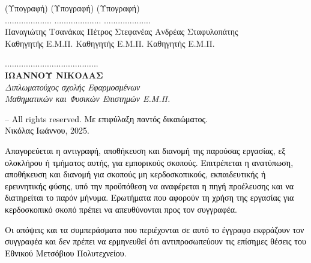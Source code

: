 \documentclass[12pt]{article}
\numberwithin{equation}{section}
\begin{document}
\begin{center}
(Υπογραφή)\hspace*{3.8cm} (Υπογραφή)\hspace*{3.8cm} (Υπογραφή)\\
\vspace{0.8 cm} 
.................... \hspace*{3.8cm} ....................\hspace*{3.7cm}  ....................\\
Παναγιώτης Τσανάκας\hspace*{2.5cm}  Πέτρος Στεφανέας\hspace*{2.2cm}  Ανδρέας Σταφυλοπάτης \\
\hspace*{-0.8cm}  Καθηγητής Ε.Μ.Π.\hspace*{3.1cm} 	 Καθηγητής Ε.Μ.Π. \hspace*{2.15cm}Καθηγητής Ε.Μ.Π. 


\vspace{2.9 cm} 






\end{center}

\newpage

\vspace*{\fill}
	{\raggedleft ........................................\\
    \textbf {ΙΩΑΝΝΟΥ ΝΙΚΟΛΑΣ}\\
    \textit{Διπλωματούχος σχολής Εφαρμοσμένων\\
    Μαθηματικών και Φυσικών Επιστημών Ε.Μ.Π.}
    
    }

\vspace*{\fill}


\vspace{2cm}
{
\small
\noindent\footnotesize \textcolor{black}{\textcopyright{} -- All rights reserved. Με επιφύλαξη παντός δικαιώματος.\\ Νικόλας Ιωάννου, 2025.}\\


\vspace{0.1cm}


\noindent\footnotesize\textcolor{black}{ Απαγορεύεται η αντιγραφή, αποθήκευση και διανομή της παρούσας εργασίας, εξ ολοκλήρου ή τμήματος αυτής, για
εμπορικούς σκοπούς. Επιτρέπεται η ανατύπωση, αποθήκευση και διανομή για σκοπούς μη κερδοσκοπικούς, εκπαιδευτικής
ή ερευνητικής φύσης, υπό την προϋπόθεση να αναφέρεται η πηγή προέλευσης και να διατηρείται το παρόν μήνυμα. Ερωτήματα που αφορούν τη χρήση της εργασίας για κερδοσκοπικό σκοπό πρέπει να απευθύνονται προς τον
συγγραφέα.
}

\vspace{0.1cm}

\noindent\footnotesize \textcolor{black}{ Οι απόψεις και τα συμπεράσματα που περιέχονται σε αυτό το έγγραφο εκφράζουν τον συγγραφέα και δεν πρέπει
να ερμηνευθεί ότι αντιπροσωπεύουν τις επίσημες θέσεις του Εθνικού Μετσόβιου Πολυτεχνείου.}}
\end{document}
